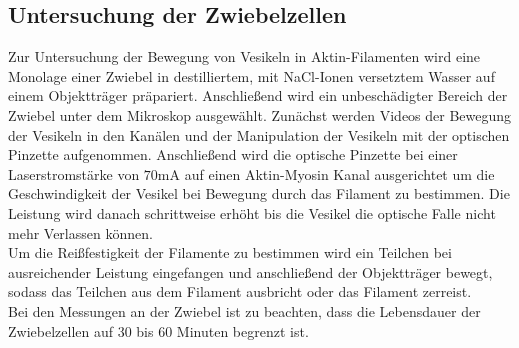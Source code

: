 \subsection{Untersuchung der Zwiebelzellen}
Zur Untersuchung der Bewegung von Vesikeln in Aktin-Filamenten wird eine Monolage einer Zwiebel in destilliertem, mit NaCl-Ionen versetztem Wasser auf einem Objektträger präpariert. Anschließend wird ein unbeschädigter Bereich der Zwiebel unter dem Mikroskop ausgewählt. Zunächst werden Videos der Bewegung der Vesikeln in den Kanälen und der Manipulation der Vesikeln mit der optischen Pinzette aufgenommen. Anschließend wird die optische Pinzette bei einer Laserstromstärke von $70 \si{\milli\ampere}$ auf einen Aktin-Myosin Kanal ausgerichtet um die Geschwindigkeit der Vesikel bei Bewegung durch das Filament zu bestimmen. Die Leistung wird danach schrittweise erhöht bis die Vesikel die optische Falle nicht mehr Verlassen können.\\
Um die Reißfestigkeit der Filamente zu bestimmen wird ein Teilchen bei ausreichender Leistung eingefangen und anschließend der Objektträger bewegt, sodass das Teilchen aus dem Filament ausbricht oder das Filament zerreist.\\
Bei den Messungen an der Zwiebel ist zu beachten, dass die Lebensdauer der Zwiebelzellen auf 30 bis 60 Minuten begrenzt ist.\\
